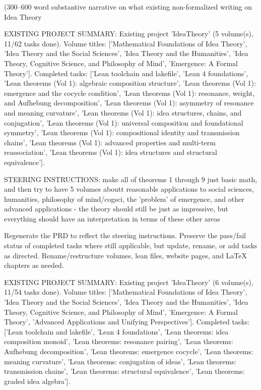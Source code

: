         (300--600 word substantive narrative on what existing non-formalized
        writing on Idea Theory

EXISTING PROJECT SUMMARY: Existing project 'IdeaTheory' (5 volume(s), 11/62 tasks done). Volume titles: ['Mathematical Foundations of Idea Theory', 'Idea Theory and the Social Sciences', 'Idea Theory and the Humanities', 'Idea Theory, Cognitive Science, and Philosophy of Mind', 'Emergence: A Formal Theory']. Completed tasks: ['Lean toolchain and lakefile', 'Lean 4 foundations', 'Lean theorems (Vol 1): algebraic composition structure', 'Lean theorems (Vol 1): emergence and the cocycle condition', 'Lean theorems (Vol 1): resonance, weight, and Aufhebung decomposition', 'Lean theorems (Vol 1): asymmetry of resonance and meaning curvature', 'Lean theorems (Vol 1): idea structures, chains, and conjugation', 'Lean theorems (Vol 1): universal composition and foundational symmetry', 'Lean theorems (Vol 1): compositional identity and transmission chains', 'Lean theorems (Vol 1): advanced properties and multi-term reassociation', 'Lean theorems (Vol 1): idea structures and structural equivalence'].

STEERING INSTRUCTIONS: make all of theorems 1 through 9 just basic math, and then try to have 5 volumes aboutt reasonable applications to social sciences, humanities, philosophy of mind/cogsci, the 'problem' of emergence, and other advanced applications - the theory should still be just as impressive, but everything should have an interpretation in terms of these other areas

Regenerate the PRD to reflect the steering instructions. Preserve the pass/fail status of completed tasks where still applicable, but update, rename, or add tasks as directed. Rename/restructure volumes, lean files, website pages, and LaTeX chapters as needed.

EXISTING PROJECT SUMMARY: Existing project 'IdeaTheory' (6 volume(s), 11/54 tasks done). Volume titles: ['Mathematical Foundations of Idea Theory', 'Idea Theory and the Social Sciences', 'Idea Theory and the Humanities', 'Idea Theory, Cognitive Science, and Philosophy of Mind', 'Emergence: A Formal Theory', 'Advanced Applications and Unifying Perspectives']. Completed tasks: ['Lean toolchain and lakefile', 'Lean 4 foundations', 'Lean theorems: idea composition monoid', 'Lean theorems: resonance pairing', 'Lean theorems: Aufhebung decomposition', 'Lean theorems: emergence cocycle', 'Lean theorems: meaning curvature', 'Lean theorems: conjugation of ideas', 'Lean theorems: transmission chains', 'Lean theorems: structural equivalence', 'Lean theorems: graded idea algebra'].

